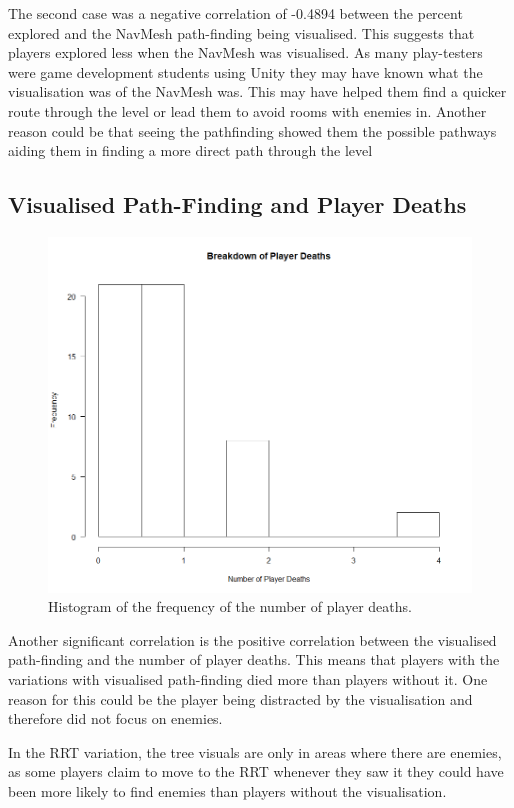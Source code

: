 \documentclass[journal]{IEEEtran}
\begin{document}
	The second case was a negative correlation of -0.4894 between the percent explored and the NavMesh path-finding being visualised. This suggests that players explored less when the NavMesh was visualised.  As many play-testers were game development students using Unity they may have known what the visualisation was of the NavMesh was. This may have helped them find a quicker route through the level or lead them to avoid rooms with enemies in. Another reason could be that seeing the pathfinding showed them the possible pathways aiding them in finding a more direct path through the level
	
	\subsection{Visualised Path-Finding and Player Deaths}
	
	\begin{figure}[h]
		\includegraphics[width=1.0\linewidth]{DeathsHisto.png}
		\caption{Histogram of the frequency of the number of player deaths.}
		\label{graph:DeathsHisto}
	\end{figure}
	Another significant correlation is the positive correlation between the visualised path-finding and the number of player deaths. This means that players with the variations with visualised path-finding died more than players without it. One reason for this could be the player being distracted by the visualisation and therefore did not focus on enemies. 
	
	In the RRT variation, the tree visuals are only in areas where there are enemies, as some players claim to move to the RRT whenever they saw it they could have been more likely to find enemies than players without the visualisation.
	
\end{document}
